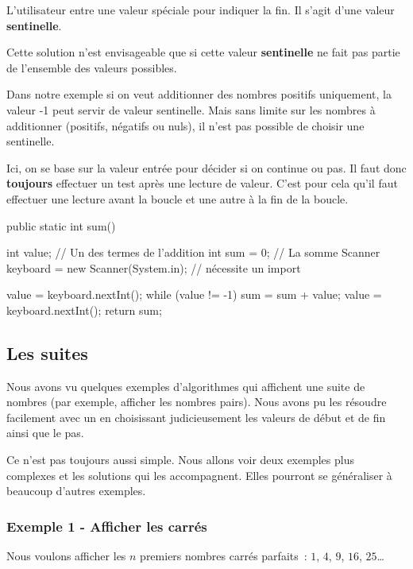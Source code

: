 		L’utilisateur entre une valeur spéciale pour indiquer la fin. Il s'agit
		d'une valeur \textbf{sentinelle}. 
		
		Cette solution n'est envisageable que si cette valeur \textbf{sentinelle} 
		ne fait pas partie de l'ensemble des valeurs possibles. 
		
		Dans notre exemple si on veut additionner des nombres positifs
		uniquement, la valeur -1 peut servir de valeur sentinelle. Mais sans
		limite sur les nombres à additionner (positifs, négatifs ou nuls), il
		n’est pas possible de choisir une sentinelle.

		Ici, on se base sur la valeur entrée pour décider si on continue ou pas.
		Il faut donc \textbf{toujours} effectuer un test après une lecture de
		valeur. C’est pour cela qu’il faut effectuer une lecture avant la boucle
		et une autre à la fin de la boucle.

		\begin{java}
public static int sum(){
	int value;			// Un des termes de l'addition
	int sum = 0;		// La somme
	Scanner keyboard = new Scanner(System.in); // nécessite un import

	value = keyboard.nextInt();
	while (value != -1){
		sum = sum + value;
		value = keyboard.nextInt();
	}
	return sum;
}	
		\end{java}

\subsection{Les suites}

	Nous avons vu quelques exemples d’algorithmes qui affichent une suite de
	nombres (par exemple, afficher les nombres pairs).  Nous avons pu les
	résoudre facilement avec un \pc{\algorithmicfor} en choisissant
	judicieusement les valeurs de début et de fin ainsi que le pas.
	
	Ce n’est pas toujours aussi simple.  Nous allons voir deux exemples plus
	complexes et les solutions qui les accompagnent.  Elles pourront se
	généraliser à beaucoup d’autres exemples.
	
	\subsubsection{Exemple 1 - Afficher les carrés}
	
		Nous voulons afficher les $n$ premiers nombres carrés parfaits~:
		$1$, $4$, $9$, $16$, $25$\dots

